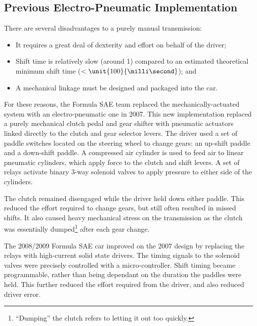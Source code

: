 \subsection{Previous Electro-Pneumatic Implementation}

There are several disadvantages to a purely manual transmission:

\begin{itemize}

\item It requires a great deal of dexterity and effort on behalf of the driver;

\item Shift time is relatively slow (around \unit{1}{\second}) compared to an estimated theoretical minimum shift time ($<\unit{100}{\milli\second}$); and 

\item A mechanical linkage must be designed and packaged into the car.

\end{itemize}

For these reasons, the Formula SAE team replaced the mechanically-actuated system with an electro-pneumatic one in 2007. This new implementation replaced a purely mechanical clutch pedal and gear shifter with pneumatic actuators linked directly to the clutch and gear selector levers. The driver used a set of paddle switches located on the steering wheel to change gears: an up-shift paddle and a down-shift paddle. A compressed air cylinder is used to feed air to linear pneumatic cylinders, which apply force to the clutch and shift levers. A set of relays activate binary 3-way solenoid valves to apply pressure to either side of the cylinders. 

The clutch remained disengaged while the driver held down either paddle. This reduced the effort required to change gears, but still often resulted in missed shifts. It also caused heavy mechanical stress on the transmission as the clutch was essentially dumped\footnote{``Dumping'' the clutch refers to letting it out too quickly.} after each gear change.

The 2008/2009 Formula SAE car improved on the 2007 design by replacing the relays with high-current solid state drivers. The timing signals to the solenoid valves were precisely controlled with a micro-controller. Shift timing became programmable, rather than being dependant on the duration the paddles were held. This further reduced the effort required from the driver, and also reduced driver error. 

